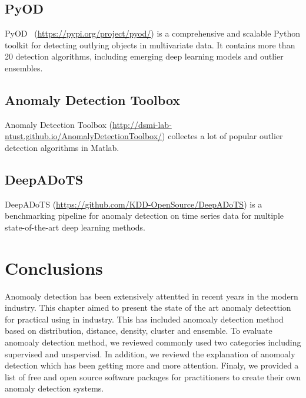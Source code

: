 \subsection{PyOD}

PyOD~\cite{zhao2019pyod} (\href{https://pypi.org/project/pyod/}{https://pypi.org/project/pyod/})
is a comprehensive and scalable Python toolkit for
detecting outlying objects in multivariate data.
It contains more than 20 detection algorithms,
including emerging deep learning models and
outlier ensembles.

\subsection{Anomaly Detection Toolbox}

Anomaly Detection Toolbox
(\href{http://dsmi-lab-ntust.github.io/AnomalyDetectionToolbox/}{http://dsmi-lab-ntust.github.io/AnomalyDetectionToolbox/})
collectes a lot of popular outlier detection algorithms in Matlab.

\subsection{DeepADoTS}

DeepADoTS (\href{https://github.com/KDD-OpenSource/DeepADoTS}{https://github.com/KDD-OpenSource/DeepADoTS})
is a benchmarking pipeline for anomaly detection on
time series data for
multiple state-of-the-art deep learning methods.


\section{Conclusions} \label{sec-conclusions}

Anomoaly detection has been extensively
attentted in recent years in the modern industry.
This chapter aimed to present the state of the art 
anomaly detecttion for practical using in industry.
This has included anomoaly detection method based on distribution, 
distance,
density,
cluster and ensemble.
To evaluate anomoaly detection method,
we reviewed commonly used 
two categories including supervised and unspervisd.
In addition,
we reviewd the explanation of anomoaly detection which
has been getting more and more attention. 
Finaly,
we provided a list of free and open source software packages for
practitioners to create their own anomaly detection systems.


